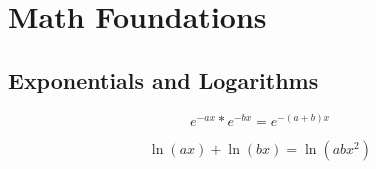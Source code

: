 \chapter{Math Foundations} \label{math_foundations}

\section{Exponentials and Logarithms}

\begin{equation}
    e^{-ax}*e^{-bx} = e^{-(a+b)x}
\end{equation}

\begin{equation}
    \ln(ax) + \ln(bx) = \ln(abx^2)
\end{equation}